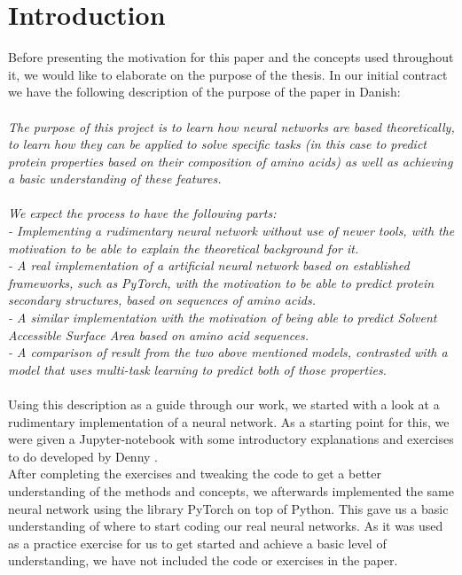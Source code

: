 \section{Introduction}
Before presenting the motivation for this paper and the concepts used throughout it, we would like to elaborate on the purpose of the thesis. In our initial contract we have the following description of the purpose of the paper in Danish:\\\\
\textit{The purpose of this project is to learn how neural networks are based theoretically, to learn how they can be applied to solve specific tasks (in this case to predict protein properties based on their composition of amino acids) as well as achieving a basic understanding of these features. \\\\
We expect the process to have the following parts:\\
- Implementing a rudimentary neural network without use of newer tools, with the motivation to be able to explain the theoretical background for it.\\
- A real implementation of a artificial neural network based on established frameworks, such as PyTorch, with the motivation to be able to predict protein secondary structures, based on sequences of amino acids. \\
- A similar implementation with the motivation of being able to predict Solvent Accessible Surface Area based on amino acid sequences. \\
- A comparison of result from the two above mentioned models, contrasted with a model that uses multi-task learning to predict both of those properties.\\ }\\
Using this description as a guide through our work, we started with a look at a rudimentary implementation of a neural network. As a starting point for this, we were given a Jupyter-notebook with some introductory explanations and exercises to do developed by Denny \citeauthor{britz}.\\
After completing the exercises and tweaking the code to get a better understanding of the methods and concepts, we afterwards implemented the same neural network using the library PyTorch on top of Python. 
This gave us a basic understanding of where to start coding our real neural networks. As it was used as a practice exercise for us to get started and achieve a basic level of understanding, we have not included the code or exercises in the paper.


